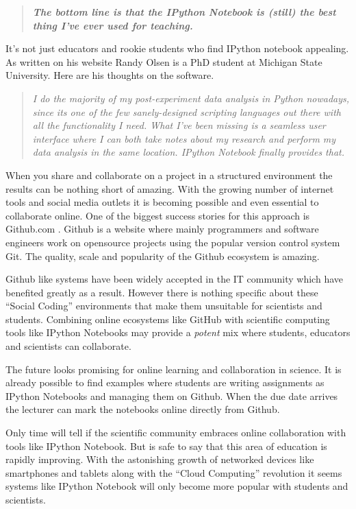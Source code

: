 \documentclass[11pt, a4paper]{article}  %
\begin{document}
\begin{multicols}{2}
\begin{quote}
\textit{\textbf{The bottom line is that the IPython Notebook is (still) the
best thing I've ever used for teaching.}}
\end{quote}

It's not just educators and rookie students who find IPython notebook
appealing. As written on his website Randy Olsen is a PhD student at Michigan
State University. Here are his thoughts on the software. \cite{olson}

\begin{quote}
\textit{I do the majority of my post-experiment data analysis in Python
nowadays, since its one of the few sanely-designed scripting languages out
there with all the functionality I need. What I've been missing is a seamless
user interface where I can both take notes about my research and perform my
data analysis in the same location. IPython Notebook finally provides that.}
\end{quote}

When you share and collaborate on a project in a structured environment the
results can be nothing short of amazing. With the growing number of internet
tools and social media outlets it is becoming possible and even essential to
collaborate online. One of the biggest success stories for this approach is
Github.com \cite{gh}. Github is a website where mainly programmers and
software engineers work on opensource projects using the popular version
control system Git. The quality, scale and popularity of the Github ecosystem
is amazing.

Github like systems have been widely accepted in the IT community which have
benefited greatly as a result. However there is nothing specific about these
``Social Coding'' environments that make them unsuitable for scientists and
students. Combining online ecosystems like GitHub with scientific computing
tools like IPython Notebooks may provide a \emph{potent} mix where students,
educators and scientists can collaborate. 

The future looks promising for online learning and collaboration in science.
It is already possible to find examples where students are writing assignments
as IPython Notebooks and managing them on Github. When the due date arrives
the lecturer can mark the notebooks online directly from Github. \cite{brown2}

Only time will tell if the scientific community embraces online collaboration
with tools like IPython Notebook. But is safe to say that this area of
education is rapidly improving. With the astonishing growth of networked
devices like smartphones and tablets along with the ``Cloud Computing''
revolution it seems systems like IPython Notebook will only become more popular
with students and scientists.

\end{multicols}



\end{document}
